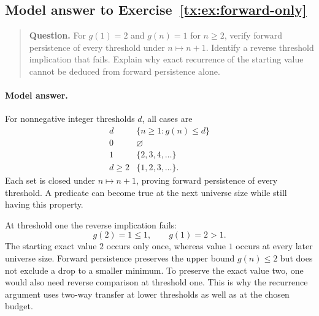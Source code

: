 \begin{samepage}

\subsection*{Model answer to Exercise~\ref{tx:ex:forward-only}}\label{tx:ans:forward-only}

\begin{quote}\small\textbf{Question.} For $g(1)=2$ and $g(n)=1$ for $n\ge2$, verify forward persistence of
every threshold under $n\mapsto n+1$. Identify a reverse threshold
implication that fails. Explain why exact recurrence of the starting
value cannot be deduced from forward persistence alone.
\end{quote}

\paragraph{Model answer.}
For nonnegative integer thresholds \(d\), all cases are
\[
 \begin{array}{c|c}
 d&\{n\ge1:g(n)\le d\}\\ \hline
 0&\varnothing\\
 1&\{2,3,4,\ldots\}\\
 d\ge2&\{1,2,3,\ldots\}.
 \end{array}
\]
Each set is closed under \(n\mapsto n+1\), proving forward
persistence of every threshold. A predicate can become true at the
next universe size while still having this property.
\end{samepage}

At threshold one the reverse implication fails:
\[
                 g(2)=1\le1,\qquad g(1)=2>1.
\]
The starting exact value \(2\) occurs only once, whereas value \(1\)
occurs at every later universe size. Forward persistence preserves the upper
bound \(g(n)\le2\) but does not exclude a drop to a smaller minimum.
To preserve the exact value two, one would also need reverse
comparison at threshold one. This is why the recurrence argument
uses two-way transfer at lower thresholds as well as at the chosen budget.


\par



